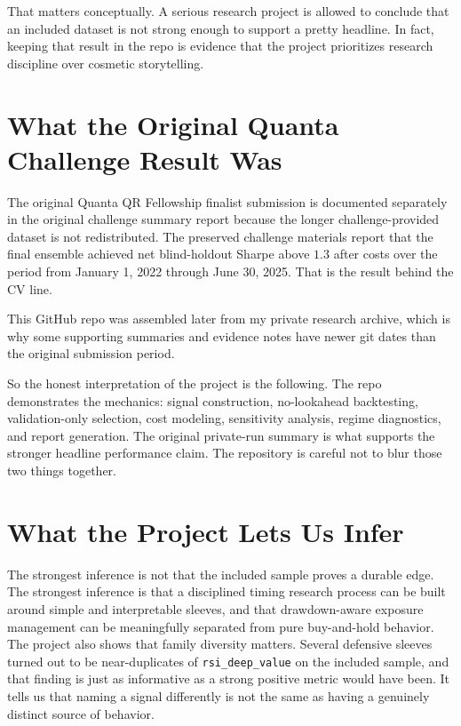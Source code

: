 \documentclass[11pt]{article}
\begin{document}
That matters conceptually. A serious research project is allowed to conclude
that an included dataset is not strong enough to support a pretty headline. In fact,
keeping that result in the repo is evidence that the project prioritizes
research discipline over cosmetic storytelling.

\section*{What the Original Quanta Challenge Result Was}

The original Quanta QR Fellowship finalist submission is documented separately
in the original challenge summary report because the longer challenge-provided
dataset is not redistributed. The preserved challenge materials report that the final
ensemble achieved net blind-holdout Sharpe above \(1.3\) after costs over the
period from January 1, 2022 through June 30, 2025. That is the result behind
the CV line.

This GitHub repo was assembled later from my private research archive, which is
why some supporting summaries and evidence notes have newer git dates than the
original submission period.

So the honest interpretation of the project is the following. The repo
demonstrates the mechanics: signal construction, no-lookahead backtesting,
validation-only selection, cost modeling, sensitivity analysis, regime
diagnostics, and report generation. The original private-run summary is what
supports the stronger headline performance claim. The repository is careful not
to blur those two things together.

\section*{What the Project Lets Us Infer}

The strongest inference is not that the included sample proves a durable edge. The
strongest inference is that a disciplined timing research process can be built
around simple and interpretable sleeves, and that drawdown-aware exposure
management can be meaningfully separated from pure buy-and-hold behavior. The
project also shows that family diversity matters. Several defensive sleeves
turned out to be near-duplicates of \texttt{rsi\_deep\_value} on the included
sample, and that finding is just as informative as a strong positive metric
would have been. It tells us that naming a signal differently is not the same as
having a genuinely distinct source of behavior.
\end{document}
